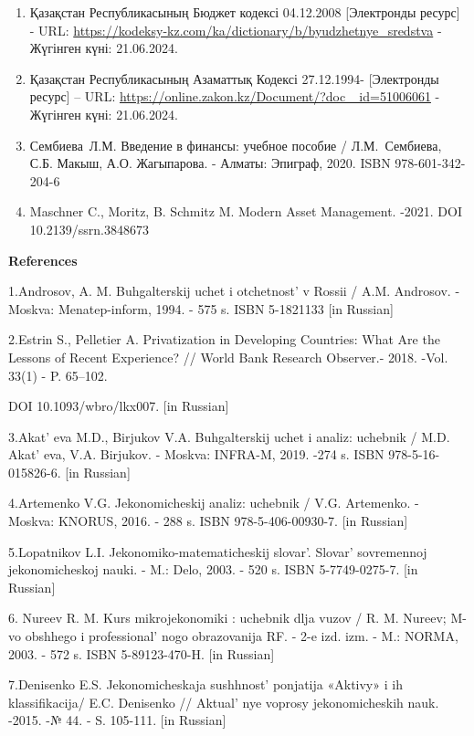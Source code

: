 {\begin{enumerate}
  кредит", "Бухгалтерский учет, анализ и аудит". - Москва: КНОРУС, 2016.
  - 303 с. ISBN 978-5-406-04851-1
\item
  Қазақстан Республикасының Бюджет кодексі 04.12.2008 {[}Электронды
  ресурс{]} - URL:
  \url{https://kodeksy-kz.com/ka/dictionary/b/byudzhetnye_sredstva} -
  Жүгінген күні: 21.06.2024.
\item
  Қазақстан Республикасының Азаматтық Кодексі 27.12.1994- {[}Электронды
  ресурс{]} -- URL:
  \href{https://online.zakon.kz/Document/?doc\%20_id=51006061}{https://online.zakon.kz/Document/?doc
  \_id=51006061} - Жүгінген күні: 21.06.2024.
\item
  Сембиева~Л.М. Введение в финансы: учебное пособие / Л.М.~Сембиева,
  С.Б. Макыш, А.О. Жагыпарова. - Алматы: Эпиграф, 2020. ISBN
  978-601-342-204-6
\item
  Maschner C., Moritz, B. Schmitz M. Modern Asset Management. -2021. DOI
  10.2139/ssrn.3848673
\end{enumerate}

{\bfseries References}

1.Androsov, A. M. Buhgalterskij uchet i otchetnost'{} v
Rossii / A.M. Androsov. -Moskva: Menatep-inform, 1994. - 575 s. ISBN
5-1821133 {[}in Russian{]}

2.Estrin S., Pelletier A. Privatization in Developing Countries: What
Are the Lessons of Recent Experience? // World Bank Research Observer.-
2018. -Vol. 33(1) - P. 65--102.

DOI 10.1093/wbro/lkx007. {[}in Russian{]}

3.Akat' eva M.D., Birjukov V.A. Buhgalterskij uchet i
analiz: uchebnik / M.D. Akat' eva, V.A. Birjukov. -
Moskva: INFRA-M, 2019. -274 s. ISBN 978-5-16-015826-6. {[}in Russian{]}

4.Artemenko V.G. Jekonomicheskij analiz: uchebnik / V.G. Artemenko. -
Moskva: KNORUS, 2016. - 288 s. ISBN 978-5-406-00930-7. {[}in Russian{]}

5.Lopatnikov L.I. Jekonomiko-matematicheskij slovar'.
Slovar'{} sovremennoj jekonomicheskoj nauki. - M.: Delo,
2003. - 520 s. ISBN 5-7749-0275-7. {[}in Russian{]}

6. Nureev R. M. Kurs mikrojekonomiki : uchebnik dlja vuzov / R. M.
Nureev; M-vo obshhego i professional' nogo obrazovanija
RF. - 2-e izd. izm. - M.: NORMA, 2003. - 572 s. ISBN 5-89123-470-H.
{[}in Russian{]}

7.Denisenko E.S. Jekonomicheskaja sushhnost'{} ponjatija
«Aktivy» i ih klassifikacija/ E.C. Denisenko //
Aktual' nye voprosy jekonomicheskih nauk. -2015. -№ 44. -
S. 105-111. {[}in Russian{]}

}
